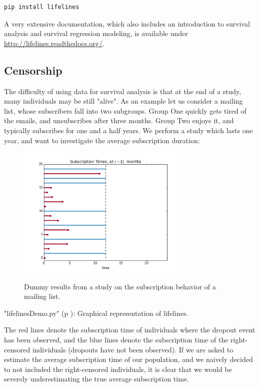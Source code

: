 \begin{lstlisting}[language=Python]
  pip install lifelines
\end{lstlisting}

 A very extensive documentation, which also includes an introduction to survival analysis and survival regression modeling, is available under \url{http://lifelines.readthedocs.org/}.

\subsection{Censorship}

The difficulty of using data for survival analysis is that at the end of a study, many individuals may be still "alive". As an example let us consider a mailing list, whose subscribers fall into two subgroups. Group One quickly gets tired of the emails, and unsubscribes after three months. Group Two enjoys it, and typically subscribes for one and a half years. We perform a study which lasts one year, and want to investigate the average subscription duration:

\begin{figure}[H]
  \centering
  \includegraphics[width=0.75\textwidth]{../Images/lifelines.png}\\
  \caption{Dummy results from a study on the subscription behavior of a mailing list.}\label{fig:lifelines}
\end{figure}

\PyImg "lifelinesDemo.py" (p \pageref{py:lifelinesDemo}): Graphical representation of lifelines.

The red lines denote the subscription time of individuals where the dropout event has been observed, and the blue lines denote the subscription time of the right-censored individuals (dropouts have not been observed). If we are asked to estimate the average subscription time of our population, and we naively decided to not included the right-censored individuals, it is clear that we would be severely underestimating the true average subscription time.

